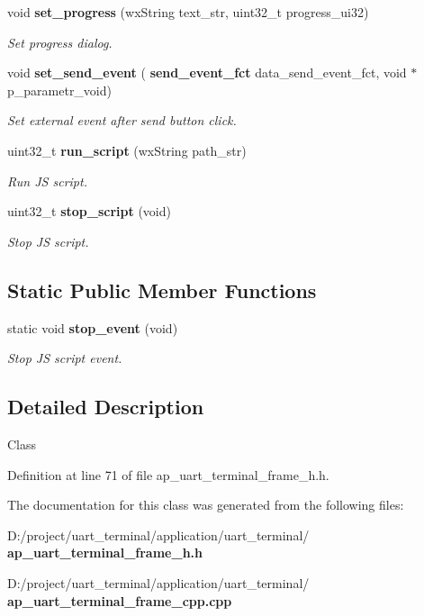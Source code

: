 \begin{DoxyCompactItemize}
void \textbf{ set\+\_\+progress} (wx\+String text\+\_\+str, uint32\+\_\+t progress\+\_\+ui32)
\begin{DoxyCompactList}\small\item\em Set progress dialog. \end{DoxyCompactList}\item 
void \textbf{ set\+\_\+send\+\_\+event} (\textbf{ send\+\_\+event\+\_\+fct} data\+\_\+send\+\_\+event\+\_\+fct, void $\ast$p\+\_\+parametr\+\_\+void)
\begin{DoxyCompactList}\small\item\em Set external event after send button click. \end{DoxyCompactList}\item 
uint32\+\_\+t \textbf{ run\+\_\+script} (wx\+String path\+\_\+str)
\begin{DoxyCompactList}\small\item\em Run JS script. \end{DoxyCompactList}\item 
uint32\+\_\+t \textbf{ stop\+\_\+script} (void)
\begin{DoxyCompactList}\small\item\em Stop JS script. \end{DoxyCompactList}\end{DoxyCompactItemize}
\subsection*{Static Public Member Functions}
\begin{DoxyCompactItemize}
\item 
static void \textbf{ stop\+\_\+event} (void)
\begin{DoxyCompactList}\small\item\em Stop JS script event. \end{DoxyCompactList}\end{DoxyCompactItemize}


\subsection{Detailed Description}
Class 

Definition at line 71 of file ap\+\_\+uart\+\_\+terminal\+\_\+frame\+\_\+h.\+h.



The documentation for this class was generated from the following files\+:\begin{DoxyCompactItemize}
\item 
D\+:/project/uart\+\_\+terminal/application/uart\+\_\+terminal/\textbf{ ap\+\_\+uart\+\_\+terminal\+\_\+frame\+\_\+h.\+h}\item 
D\+:/project/uart\+\_\+terminal/application/uart\+\_\+terminal/\textbf{ ap\+\_\+uart\+\_\+terminal\+\_\+frame\+\_\+cpp.\+cpp}\end{DoxyCompactItemize}
